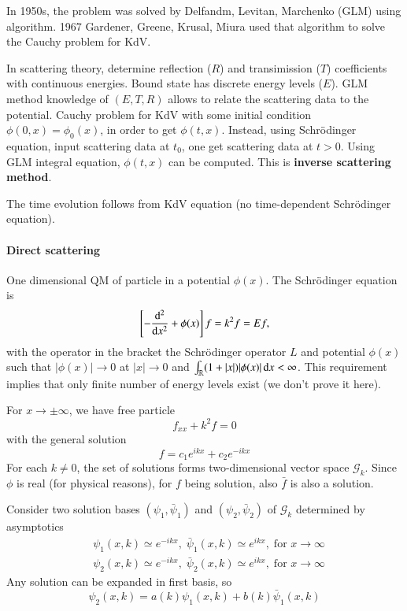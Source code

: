 In 1950s, the problem was solved by Delfandm, Levitan, Marchenko (GLM) using algorithm. 1967 Gardener, Greene, Krusal, Miura used that algorithm to solve the Cauchy problem for KdV.

In scattering theory, determine reflection ($R$) and transimission ($T$) coefficients with continuous energies. Bound state has discrete energy levels ($E$). GLM method knowledge of $(E, T, R)$ allows to relate the scattering data to the potential. Cauchy problem for KdV with some initial condition $\phi(0, x) = \phi_0 (x)$, in order to get $\phi(t, x)$. Instead, using Schrödinger equation, input scattering data at $t_0$, one get scattering data at $t > 0$. Using GLM integral equation, $\phi(t, x)$ can be computed. This is \textbf{inverse scattering method}.

The time evolution follows from KdV equation (no time-dependent Schrödinger equation).

\paragraph{Direct scattering}
One dimensional QM of particle in a potential $\phi(x)$. The Schrödinger equation is 
\begin{equation*}
	\left[ - \dv[2]{x} + \phi(x) \right]  f = k^2 f = E f,
\end{equation*}
with the operator in the bracket the Schrödinger operator $L$ and potential $\phi(x)$ such that $|\phi(x)| \rightarrow 0$ at $|x|\rightarrow 0$ and $\int_{\mathbb{R}} (1 + |x|) |\phi(x)|\dd{x} < \infty$. This requirement implies that only finite number of energy levels exist (we don't prove it here).

For $x \rightarrow \pm \infty$, we have free particle
\begin{equation*}
	f_{x x } + k^2 f =0
\end{equation*}
with the general solution
\begin{equation}
	f = c_1 e^{ikx} + c_2 e^{-ikx}
\end{equation}
For each $k \neq 0$, the set of solutions forms two-dimensional vector space $\mathcal{G}_k$. Since $\phi$ is real (for physical reasons), for $f$ being solution, also $\bar{f}$ is also a solution.

Consider two solution bases $(\psi_1, \bar{\psi}_1)$ and $(\psi_2, \bar{\psi}_2)$ of $\mathcal{G}_k$ determined by asymptotics
\begin{align*}
	&\psi_1 (x, k) \simeq e^{-ikx}, \; \bar{\psi}_1(x,k) \simeq e^{ikx}, \; \text{for } x\rightarrow \infty \\
	&\psi_2 (x, k) \simeq e^{-ikx}, \; \bar{\psi}_2(x,k) \simeq e^{ikx}, \; \text{for } x\rightarrow \infty
\end{align*}
Any solution can be expanded in first basis, so
\begin{equation*}
	\psi_2(x, k) = a(k) \psi_1 (x,k ) + b(k) \bar{\psi}_1(x,k)
\end{equation*}


